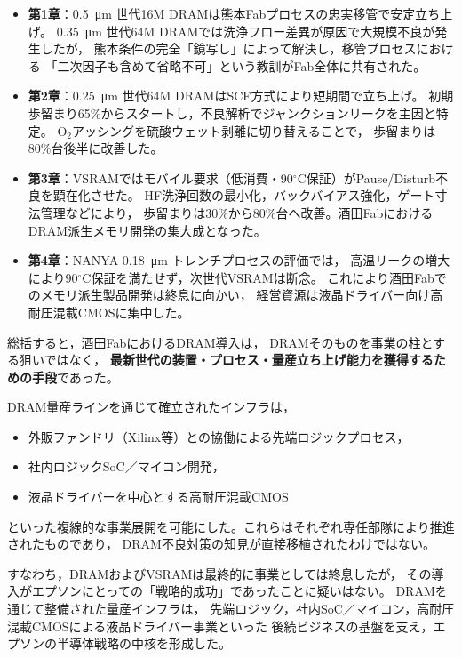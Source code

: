 \documentclass[conference]{IEEEtran}
\let\meter\metre
\begin{document}
\begin{itemize}
  \item \textbf{第1章}：\SI{0.5}{\micro\meter} 世代16M DRAMは熊本Fabプロセスの忠実移管で安定立ち上げ。
        \SI{0.35}{\micro\meter} 世代64M DRAMでは洗浄フロー差異が原因で大規模不良が発生したが，
        熊本条件の完全「鏡写し」によって解決し，移管プロセスにおける
        「二次因子も含めて省略不可」という教訓がFab全体に共有された。
  \item \textbf{第2章}：\SI{0.25}{\micro\meter} 世代64M DRAMはSCF方式により短期間で立ち上げ。
        初期歩留まり65\%からスタートし，不良解析でジャンクションリークを主因と特定。
        O$_2$アッシングを硫酸ウェット剥離に切り替えることで，
        歩留まりは80\%台後半に改善した。
  \item \textbf{第3章}：VSRAMではモバイル要求（低消費・90$^\circ$C保証）がPause/Disturb不良を顕在化させた。
        HF洗浄回数の最小化，バックバイアス強化，ゲート寸法管理などにより，
        歩留まりは30\%から80\%台へ改善。酒田FabにおけるDRAM派生メモリ開発の集大成となった。
  \item \textbf{第4章}：NANYA \SI{0.18}{\micro\meter} トレンチプロセスの評価では，
        高温リークの増大により90$^\circ$C保証を満たせず，次世代VSRAMは断念。
        これにより酒田Fabでのメモリ派生製品開発は終息に向かい，
        経営資源は液晶ドライバー向け高耐圧混載CMOSに集中した。
\end{itemize}

\noindent
総括すると，酒田FabにおけるDRAM導入は，
DRAMそのものを事業の柱とする狙いではなく，
\textbf{最新世代の装置・プロセス・量産立ち上げ能力を獲得するための手段}であった。  

DRAM量産ラインを通じて確立されたインフラは，
\begin{itemize}
  \item 外販ファンドリ（Xilinx等）との協働による先端ロジックプロセス，
  \item 社内ロジックSoC／マイコン開発，
  \item 液晶ドライバーを中心とする高耐圧混載CMOS
\end{itemize}
といった複線的な事業展開を可能にした。これらはそれぞれ専任部隊により推進されたものであり，
DRAM不良対策の知見が直接移植されたわけではない。  

\noindent
すなわち，DRAMおよびVSRAMは最終的に事業としては終息したが，
その導入がエプソンにとっての「戦略的成功」であったことに疑いはない。  
DRAMを通じて整備された量産インフラは，
先端ロジック，社内SoC／マイコン，高耐圧混載CMOSによる液晶ドライバー事業といった
後続ビジネスの基盤を支え，エプソンの半導体戦略の中核を形成した。
\end{document}

